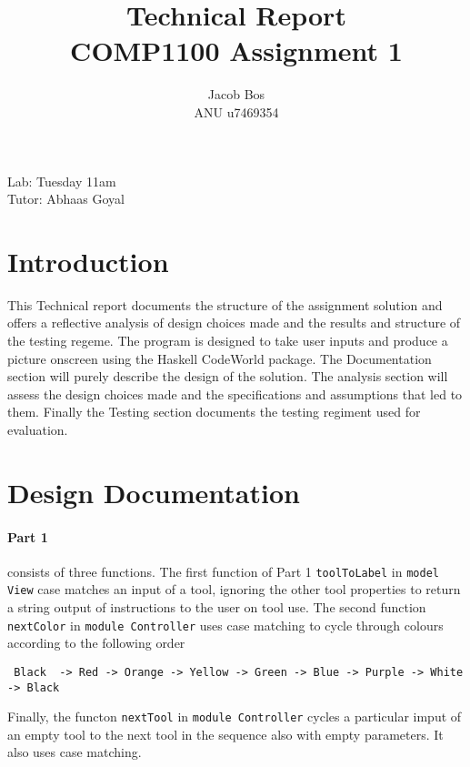 \documentclass[11pt]{article}
\title{Technical Report\\ COMP1100 Assignment 1}
\author{Jacob Bos\\ ANU u7469354}
\begin{document}
\maketitle
{}
\begin{center}
  Lab: Tuesday 11am\\
  Tutor: Abhaas Goyal
\end{center}
\tableofcontents
\newpage
{}
\section{Introduction} 
This Technical report documents the structure of the assignment solution and offers a reflective analysis of design choices made and the results and structure of the testing regeme. The program is designed to take user inputs and produce a picture onscreen using the Haskell CodeWorld package. The Documentation section will purely describe the design of the solution. The analysis section will assess the design choices made and the specifications and assumptions that led to them. Finally the Testing section documents the testing regiment used for evaluation. 


\section{Design Documentation}%

\paragraph{Part 1} consists of three functions. The first function of Part 1 \verb|toolToLabel| in \verb|model View| case matches an input of a tool, ignoring the other tool properties to return a string output of instructions to the user on tool use. The second function \verb|nextColor| in \verb|module Controller| uses case matching to cycle through colours according to the following order
\begin{verbatim} Black  -> Red -> Orange -> Yellow -> Green -> Blue -> Purple -> White -> Black\end{verbatim}
Finally, the functon \verb|nextTool| in \verb|module Controller| cycles a particular imput of an empty tool to the next tool in the sequence also with empty parameters. It also uses case matching.
\end{document}
